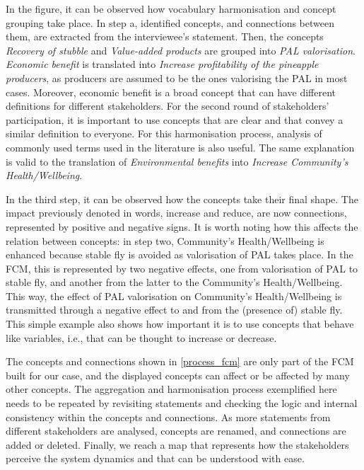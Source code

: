 In the figure, it can be observed how vocabulary harmonisation and concept grouping take place. In step a, identified concepts, and connections between them, are extracted from the interviewee's statement. Then, the concepts \textit{Recovery of stubble} and \textit{Value-added products} are grouped into \textit{PAL valorisation}. \textit{Economic benefit} is translated into \textit{Increase profitability of the pineapple producers}, as producers are assumed to be the ones valorising the PAL in most cases. Moreover, economic benefit is a broad concept that can have different definitions for different stakeholders. For the second round of stakeholders' participation, it is important to use concepts that are clear and that convey a similar definition to everyone. For this harmonisation process, analysis of commonly used terms used in the literature is also useful. The same explanation is valid to the translation of \textit{Environmental benefits} into \textit{Increase Community’s Health/Wellbeing}. 

In the third step, it can be observed how the concepts take their final shape. The impact previously denoted in words, increase and reduce, are now connections, represented by positive and negative signs. It is worth noting how this affects the relation between concepts: in step two, Community’s Health/Wellbeing is enhanced because stable fly is avoided as valorisation of PAL takes place. In the FCM, this is represented by two negative effects, one from valorisation of PAL to stable fly, and another from the latter to the Community’s Health/Wellbeing. This way, the effect of PAL valorisation on Community’s Health/Wellbeing is transmitted through a negative effect to and from the  (presence of) stable fly. This simple example also shows how important it is to use concepts that behave like variables, i.e., that can be thought to increase or decrease. 

The concepts and connections shown in \cref{process_fcm} are only part of the FCM built for our case, and the displayed concepts can affect or be affected by many other concepts. The aggregation and harmonisation process exemplified here needs to be repeated by revisiting statements and checking the logic and internal consistency within the concepts and connections. As more statements from different stakeholders are analysed, concepts are renamed, and connections are added or deleted. Finally, we reach a map that represents how the stakeholders perceive the system dynamics and that can be understood with ease. 

